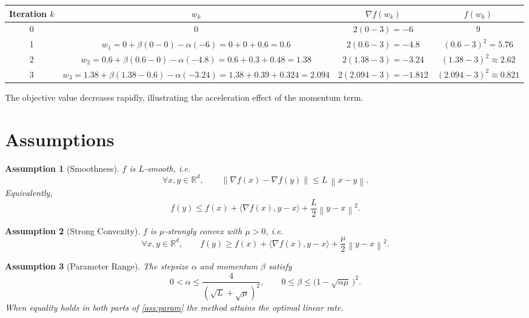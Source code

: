 \documentclass{article}
\newcommand{\R}{\mathbb{R}}
\newcommand{\norm}[1]{\left\|#1\right\|}
\newtheorem{assumption}{Assumption}
\begin{document}
\begin{center}
\begin{tabular}{c|c|c|c}
Iteration $k$ & $w_k$ & $\nabla f(w_k)$ & $f(w_k)$\\ \hline
0 & $0$ & $2(0-3)=-6$ & $9$\\
1 & $w_1=0+\beta(0-0)-\alpha(-6)=0+0+0.6=0.6$ & $2(0.6-3)=-4.8$ & $(0.6-3)^2=5.76$\\
2 & $w_2=0.6+\beta(0.6-0)-\alpha(-4.8)=0.6+0.3+0.48=1.38$ & $2(1.38-3)=-3.24$ & $(1.38-3)^2\approx2.62$\\
3 & $w_3=1.38+\beta(1.38-0.6)-\alpha(-3.24)=1.38+0.39+0.324=2.094$ & $2(2.094-3)=-1.812$ & $(2.094-3)^2\approx0.821$
\end{tabular}
\end{center}
The objective value decreases rapidly, illustrating the acceleration effect of the momentum term.

\newpage
\section*{Assumptions}
\begin{assumption}[Smoothness]\label{ass:smooth}
$f$ is $L$‑smooth, i.e.
\[
\forall x,y\in\R^{d},\qquad
\norm{\nabla f(x)-\nabla f(y)}\le L\,\norm{x-y}.
\tag{A1}
\]
Equivalently,
\[
f(y)\le f(x)+\langle\nabla f(x),y-x\rangle+\frac{L}{2}\norm{y-x}^{2}.
\tag{A1'}
\]
\end{assumption}

\begin{assumption}[Strong Convexity]\label{ass:strong}
$f$ is $\mu$‑strongly convex with $\mu>0$, i.e.
\[
\forall x,y\in\R^{d},\qquad
f(y)\ge f(x)+\langle\nabla f(x),y-x\rangle+\frac{\mu}{2}\norm{y-x}^{2}.
\tag{A2}
\]
\end{assumption}

\begin{assumption}[Parameter Range]\label{ass:param}
The stepsize $\alpha$ and momentum $\beta$ satisfy
\[
0<\alpha\le \frac{4}{(\sqrt{L}+\sqrt{\mu})^{2}},\qquad
0\le\beta\le\bigl(1-\sqrt{\alpha\mu}\,\bigr)^{2}.
\tag{A3}
\]
When equality holds in both parts of \eqref{ass:param} the method attains the optimal linear rate.
\end{assumption}
\end{document}
